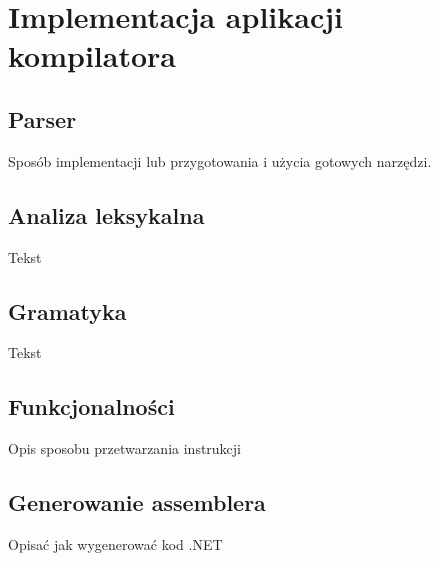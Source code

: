 \chapter{Implementacja aplikacji kompilatora}
\label{rozdzial3}

\section{Parser}
Sposób implementacji lub przygotowania i użycia gotowych narzędzi.

\section{Analiza leksykalna}
Tekst
\section{Gramatyka}
Tekst
\section{Funkcjonalności}
Opis sposobu przetwarzania instrukcji
\section{Generowanie assemblera}
Opisać jak wygenerować kod .NET

